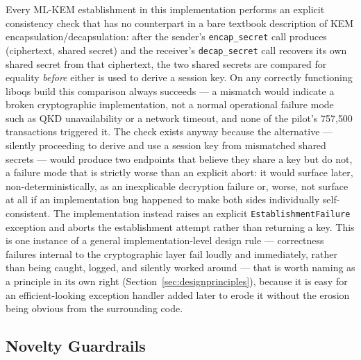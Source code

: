 \documentclass[journal]{IEEEtran}
\begin{document}
Every ML-KEM establishment in this implementation performs an explicit consistency check that has no counterpart in a bare textbook description of KEM encapsulation/decapsulation: after the sender's \texttt{encap\_secret} call produces (ciphertext, shared secret) and the receiver's \texttt{decap\_secret} call recovers its own shared secret from that ciphertext, the two shared secrets are compared for equality \emph{before} either is used to derive a session key. On any correctly functioning liboqs build this comparison always succeeds --- a mismatch would indicate a broken cryptographic implementation, not a normal operational failure mode such as QKD unavailability or a network timeout, and none of the pilot's 757{,}500 transactions triggered it. The check exists anyway because the alternative --- silently proceeding to derive and use a session key from mismatched shared secrets --- would produce two endpoints that believe they share a key but do not, a failure mode that is strictly worse than an explicit abort: it would surface later, non-deterministically, as an inexplicable decryption failure or, worse, not surface at all if an implementation bug happened to make both sides individually self-consistent. The implementation instead raises an explicit \texttt{EstablishmentFailure} exception and aborts the establishment attempt rather than returning a key. This is one instance of a general implementation-level design rule --- correctness failures internal to the cryptographic layer fail loudly and immediately, rather than being caught, logged, and silently worked around --- that is worth naming as a principle in its own right (Section~\ref{sec:designprinciples}), because it is easy for an efficient-looking exception handler added later to erode it without the erosion being obvious from the surrounding code.

\subsection{Novelty Guardrails}
\label{sec:novelty}
\end{document}
